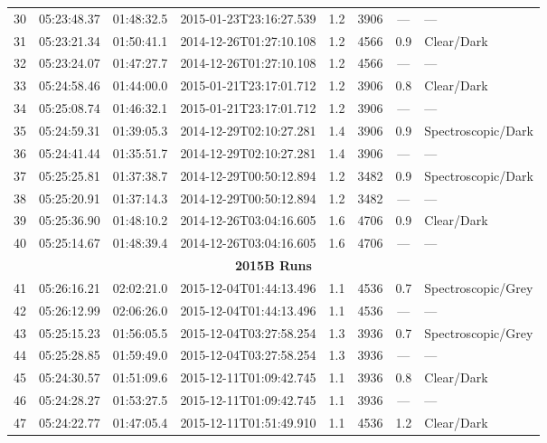 \documentclass[12pt]{article}
\begin{document}
\begin{table}
\begin{center}
\begin{threeparttable}
\begin{tabular}{lccccccl}
	30 & 05:23:48.37 & 01:48:32.5 & 2015-01-23T23:16:27.539 & 1.2  & 3906 & ---      & ---                 \\
	31 & 05:23:21.34 & 01:50:41.1 & 2014-12-26T01:27:10.108 & 1.2  & 4566 & 0.9      & Clear/Dark          \\
	32 & 05:23:24.07 & 01:47:27.7 & 2014-12-26T01:27:10.108 & 1.2  & 4566 & ---      & ---                 \\
	33 & 05:24:58.46 & 01:44:00.0 & 2015-01-21T23:17:01.712 & 1.2  & 3906 & 0.8      & Clear/Dark          \\
	34 & 05:25:08.74 & 01:46:32.1 & 2015-01-21T23:17:01.712 & 1.2  & 3906 & ---      & ---                 \\
	35 & 05:24:59.31 & 01:39:05.3 & 2014-12-29T02:10:27.281 & 1.4  & 3906 & 0.9      & Spectroscopic/Dark  \\
	36 & 05:24:41.44 & 01:35:51.7 & 2014-12-29T02:10:27.281 & 1.4  & 3906 & ---      & ---                 \\
	37 & 05:25:25.81 & 01:37:38.7 & 2014-12-29T00:50:12.894 & 1.2  & 3482 & 0.9      & Spectroscopic/Dark  \\
	38 & 05:25:20.91 & 01:37:14.3 & 2014-12-29T00:50:12.894 & 1.2  & 3482 & ---      & ---                 \\
	39 & 05:25:36.90 & 01:48:10.2 & 2014-12-26T03:04:16.605 & 1.6  & 4706 & 0.9      & Clear/Dark          \\
	40 & 05:25:14.67 & 01:48:39.4 & 2014-12-26T03:04:16.605 & 1.6  & 4706 & ---      & ---                 \\
	\multicolumn{8}{c}{{\bf 2015B Runs}} \\
	41 & 05:26:16.21 & 02:02:21.0 & 2015-12-04T01:44:13.496 & 1.1  & 4536 & 0.7      & Spectroscopic/Grey  \\
	42 & 05:26:12.99 & 02:06:26.0 & 2015-12-04T01:44:13.496 & 1.1  & 4536 & ---      & ---                 \\
	43 & 05:25:15.23 & 01:56:05.5 & 2015-12-04T03:27:58.254 & 1.3  & 3936 & 0.7      & Spectroscopic/Grey  \\
	44 & 05:25:28.85 & 01:59:49.0 & 2015-12-04T03:27:58.254 & 1.3  & 3936 & ---      & ---                 \\
	45 & 05:24:30.57 & 01:51:09.6 & 2015-12-11T01:09:42.745 & 1.1  & 3936 & 0.8      & Clear/Dark          \\
	46 & 05:24:28.27 & 01:53:27.5 & 2015-12-11T01:09:42.745 & 1.1  & 3936 & ---      & ---                 \\
	47 & 05:24:22.77 & 01:47:05.4 & 2015-12-11T01:51:49.910 & 1.1  & 4536 & 1.2      & Clear/Dark          \\

\end{tabular}
\end{threeparttable}
\end{center}
\end{table}
\end{document}
